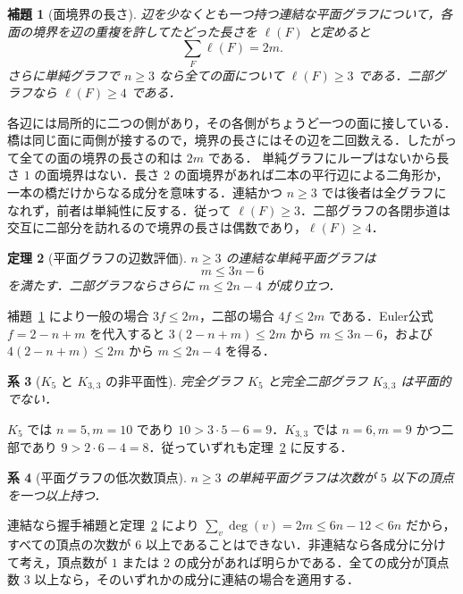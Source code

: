 \documentclass[a5paper,10pt,onecolumn]{jsarticle}
\makeatletter
\theoremstyle{mathnotetheorem}
\newtheorem{theorem}{定理}[section]
\newtheorem{lemma}[theorem]{補題}
\newtheorem{corollary}[theorem]{系}
\renewcommand{\proofname}{証明}
\renewenvironment{proof}[1][\proofname]{%
  \par\pushQED{\qed}\normalfont\topsep4\p@\@plus2\p@\relax
  \trivlist\item[\hskip\labelsep\bfseries #1]\ignorespaces
}{\popQED\endtrivlist\@endpefalse}
\makeatother
\begin{document}
\begin{lemma}[面境界の長さ]\label{lem:boundary}
辺を少なくとも一つ持つ連結な平面グラフについて，各面の境界を辺の重複を許してたどった長さを $\ell(F)$ と定めると
\[
 \sum_F\ell(F)=2m.
\]
さらに単純グラフで $n\ge3$ なら全ての面について $\ell(F)\ge3$ である．二部グラフなら $\ell(F)\ge4$ である．
\end{lemma}
\begin{proof}
各辺には局所的に二つの側があり，その各側がちょうど一つの面に接している．橋は同じ面に両側が接するので，境界の長さにはその辺を二回数える．したがって全ての面の境界の長さの和は $2m$ である．
単純グラフにループはないから長さ $1$ の面境界はない．長さ $2$ の面境界があれば二本の平行辺による二角形か，一本の橋だけからなる成分を意味する．連結かつ $n\ge3$ では後者は全グラフになれず，前者は単純性に反する．従って $\ell(F)\ge3$．二部グラフの各閉歩道は交互に二部分を訪れるので境界の長さは偶数であり，$\ell(F)\ge4$．
\end{proof}

\begin{theorem}[平面グラフの辺数評価]\label{thm:planarbound}
$n\ge3$ の連結な単純平面グラフは
\[
 m\le3n-6
\]
を満たす．二部グラフならさらに $m\le2n-4$ が成り立つ．
\end{theorem}
\begin{proof}
補題~\ref{lem:boundary} により一般の場合 $3f\le 2m$，二部の場合 $4f\le 2m$ である．Euler公式 $f=2-n+m$ を代入すると
$3(2-n+m)\le2m$ から $m\le3n-6$，および $4(2-n+m)\le2m$ から $m\le2n-4$ を得る．
\end{proof}

\begin{corollary}[$K_5$ と $K_{3,3}$ の非平面性]
完全グラフ $K_5$ と完全二部グラフ $K_{3,3}$ は平面的でない．
\end{corollary}
\begin{proof}
$K_5$ では $n=5,m=10$ であり $10>3\cdot5-6=9$．$K_{3,3}$ では $n=6,m=9$ かつ二部であり $9>2\cdot6-4=8$．従っていずれも定理~\ref{thm:planarbound} に反する．
\end{proof}

\begin{corollary}[平面グラフの低次数頂点]
$n\ge3$ の単純平面グラフは次数が $5$ 以下の頂点を一つ以上持つ．
\end{corollary}
\begin{proof}
連結なら握手補題と定理~\ref{thm:planarbound} により
$\sum_v\deg(v)=2m\le6n-12<6n$ だから，すべての頂点の次数が $6$ 以上であることはできない．非連結なら各成分に分けて考え，頂点数が $1$ または $2$ の成分があれば明らかである．全ての成分が頂点数 $3$ 以上なら，そのいずれかの成分に連結の場合を適用する．
\end{proof}
\end{document}
